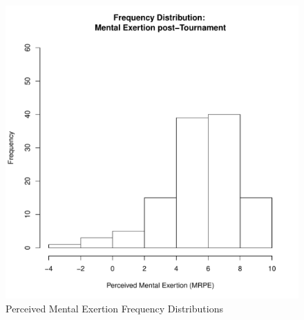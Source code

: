 \documentclass[12pt]{report}
\begin{document}
{\begin{figure}[htbp]
  \includegraphics[scale =.4]{../images/distMentalPost.pdf}
  \caption{Perceived Mental Exertion Frequency Distributions}
  \label{fig:mentalDist}
\end{figure}




}
\end{document}
